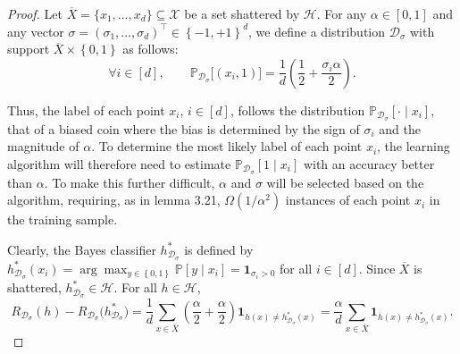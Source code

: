 \begin{proof}
Let $\overline{X}=\{x_{1},\dots,x_{d}\}\subseteq\mathcal{X}$ be a set shattered by $\mathcal{H}$. For any $\alpha\in\left[0,1\right]$ and any vector $\sigma=\left(\sigma_{1},\dots,\sigma_{d}\right)^{\top}\in\left\{-1,+1\right\}^{d}$, we define a distribution $\mathcal{D}_{\sigma}$ with support $\overline{X}\times\left\{0,1\right\}$ as follows:
\begin{equation}
\forall i\in\left[d\right],\qquad
\mathbb{P}_{\mathcal{D}_{\sigma}}\bigl[\left(x_{i},1\right)\bigr]
= \frac{1}{d}\left(\frac{1}{2} + \frac{\sigma_{i}\alpha}{2}\right).
\end{equation}

Thus, the label of each point $x_{i}$, $i\in\left[d\right]$, follows the distribution $\mathbb{P}_{\mathcal{D}_{\sigma}}\left[\cdot\mid x_{i}\right]$, that of a biased coin where the bias is determined by the sign of $\sigma_{i}$ and the magnitude of $\alpha$. To determine the most likely label of each point $x_{i}$, the learning algorithm will therefore need to estimate $\mathbb{P}_{\mathcal{D}_{\sigma}}\left[1\mid x_{i}\right]$ with an accuracy better than $\alpha$. To make this further difficult, $\alpha$ and $\sigma$ will be selected based on the algorithm, requiring, as in lemma 3.21, $\Omega\left(1/\alpha^{2}\right)$ instances of each point $x_{i}$ in the training sample.

Clearly, the Bayes classifier $h^{\ast}_{\mathcal{D}_{\sigma}}$ is defined by $h^{\ast}_{\mathcal{D}_{\sigma}}\left(x_{i}\right)=\arg\max_{y\in\left\{0,1\right\}}\mathbb{P}\left[y\mid x_{i}\right]=\mathbf{1}_{\sigma_{i}>0}$ for all $i\in\left[d\right]$. Since $\overline{X}$ is shattered, $h^{\ast}_{\mathcal{D}_{\sigma}}\in\mathcal{H}$. For all $h\in\mathcal{H}$,
\begin{equation}
R_{\mathcal{D}_{\sigma}}(h)-R_{\mathcal{D}_{\sigma}}\bigl(h^{\ast}_{\mathcal{D}_{\sigma}}\bigr)
= \frac{1}{d}\sum_{x\in\overline{X}}\left(\frac{\alpha}{2}+\frac{\alpha}{2}\right)\mathbf{1}_{h(x)\neq h^{\ast}_{\mathcal{D}_{\sigma}}(x)}
= \frac{\alpha}{d}\sum_{x\in\overline{X}}\mathbf{1}_{h(x)\neq h^{\ast}_{\mathcal{D}_{\sigma}}(x)}.
\end{equation}


\end{proof}
